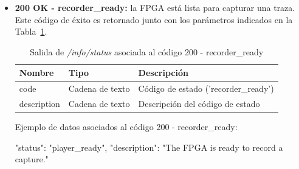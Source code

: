 \begin{itemize}
{\begin{minipage}{\textwidth}
\begin{code}[language=json]
{
  "status": "player_ready",
  "description": "The FPGA is ready to reproduce a capture."
}
\end{code}
\end{minipage}
}

\item{\textbf{200 OK - recorder\_ready:} la \gls{FPGA} está lista para capturar una \gls{traza}.
Este código de éxito es retornado junto con los parámetros indicados en la Tabla~\ref{extra:api:infostatus:recorderready}.
\begin{table}[H]
\centering
\begin{tabular}{|l|l|l|}
\hline
\rowcolor[HTML]{F5F5F5}
\textbf{Nombre}  & \textbf{Tipo}   & \textbf{Descripción}                 \\ \hline
code             & Cadena de texto & Código de estado ('recorder\_ready') \\ \hline
description      & Cadena de texto & Descripción del código de estado     \\ \hline
\end{tabular}
\caption{Salida de \textit{/info/status} asociada al código 200 - recorder\_ready}
\label{extra:api:infostatus:recorderready}
\end{table}
\begin{minipage}{\textwidth}
Ejemplo de datos asociados al código 200 - recorder\_ready:

\begin{code}[language=json]
{
  "status": "player_ready",
  "description": "The FPGA is ready to record a capture."
}
\end{code}
\end{minipage}
}


\end{itemize}
